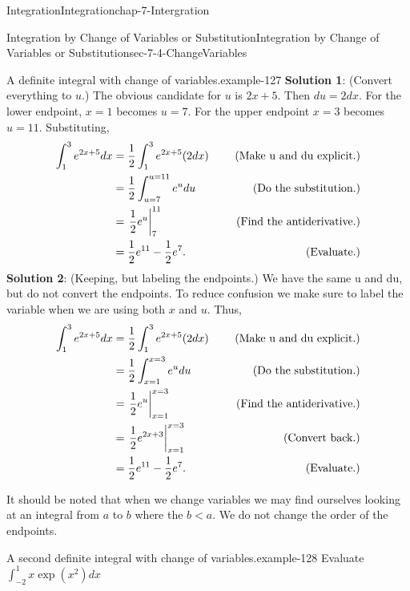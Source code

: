 \documentclass[oneside,10pt,]{book}
\newcommand{\terminology}[1]{\textbf{#1}}
\numberwithin{equation}{section}
\newcommand{\lt}{<}
\newcommand{\amp}{&}
\begin{document}
\begin{chapterptx}{Integration}{}{Integration}{}{}{chap-7-Intergration}
\begin{sectionptx}{Integration by Change of Variables or Substitution}{}{Integration by Change of Variables or Substitution}{}{}{sec-7-4-ChangeVariables}
\begin{example}{A definite integral with change of variables.}{example-127}
\terminology{Solution 1}:  (Convert everything to \(u\).) The obvious candidate for \(u\) is \(2x+5\).  Then    \(du=2dx\).  For the lower endpoint, \(x=1\) becomes \(u=7\).  For the upper endpoint \(x=3\) becomes \(u=11\).  Substituting,%
%
\begin{equation*}
\begin{aligned}  \int_1^3 e^{2x+5} dx
\amp =\frac{1}{2} \int_1^3 e^{2x+5} (2dx)
\amp \quad \hbox{ (Make u and du explicit.)}\\ 
\amp =\frac{1}{2} \int_{u=7}^{u=11}e^u du
\amp \quad \hbox{ (Do the substitution.)}\\ 
\amp =\left.\frac{1}{2} e^u\right|_7^{11}
\amp \quad \hbox{ (Find the antiderivative.)}\\ 
\amp =\frac{1}{2} e^{11}-\frac{1}{2} e^7.
\amp \quad \hbox{ (Evaluate.)}\\ 
\end{aligned}
\end{equation*}
\hypertarget{p-2851}{}%
\terminology{Solution 2}:  (Keeping, but labeling the endpoints.) We have the same u and du, but do not convert the endpoints.  To reduce confusion we make sure to label the variable when we are using both \(x\) and \(u\).  Thus,%
%
\begin{equation*}
\begin{aligned}  \int_1^3 e^{2x+5} dx
\amp =\frac{1}{2} \int_1^3 e^{2x+5} (2dx)
\amp \quad \hbox{ (Make u and du explicit.)}\\ 
\amp =\frac{1}{2} \int_{x=1}^{x=3}e^u du
\amp \quad \hbox{ (Do the substitution.)}\\ 
\amp =\left.\frac{1}{2} e^u\right|_{x=1}^{x=3}
\amp \quad \hbox{ (Find the antiderivative.)}\\ 
\amp =\left.\frac{1}{2} e^{2x+3}\right|_{x=1}^{x=3}
\amp \quad \hbox{ (Convert back.)}\\ 
\amp =\frac{1}{2}  e^{11}-\frac{1}{2} e^7.
\amp \quad \hbox{ (Evaluate.)}\\ 
\end{aligned}
\end{equation*}
\end{example}
\hypertarget{p-2852}{}%
It should be noted that when we change variables we may find ourselves looking at an integral from \(a\) to \(b\) where the \(b \lt a\).  We do not change the order of the endpoints.%
\begin{example}{A second definite integral with change of variables.}{example-128}%
\hypertarget{p-2853}{}%
Evaluate \(\int_{-2}^1 x \exp(x^2)dx\)%
\par

\end{example}
\end{sectionptx}
\end{chapterptx}
\end{document}
